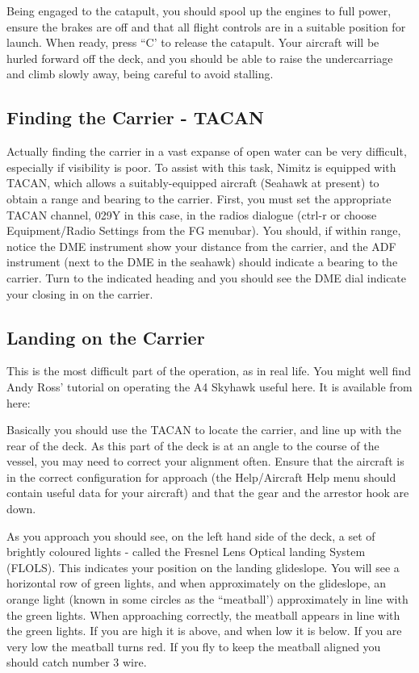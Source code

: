 Being engaged to the catapult, you should spool up the engines to full power, ensure the brakes are off 
and that all flight controls are in a suitable position for launch. When ready, press ``C' to release 
the catapult. Your aircraft will be hurled forward off the deck, and you should be able to raise the 
undercarriage and climb slowly away, being careful to avoid stalling.

\subsection{Finding the Carrier - TACAN}

Actually finding the carrier in a vast expanse of open water can be very difficult, especially if visibility 
is poor. To assist with this task, Nimitz is equipped with TACAN, which allows a suitably-equipped 
aircraft (Seahawk at present) to obtain a range and bearing to the carrier. First, you must set 
the appropriate TACAN channel, 029Y in this case, in the radios dialogue (ctrl-r or choose 
Equipment/Radio Settings from the FG menubar). You should, if within range, notice the DME instrument 
show your distance from the carrier, and the ADF instrument (next to the DME in the seahawk) should 
indicate a bearing to the carrier. Turn to the indicated heading and you should see the DME dial 
indicate your closing in on the carrier.

\subsection{Landing on the Carrier}

This is the most difficult part of the operation, as in real life. You might well find Andy Ross' tutorial on 
operating the A4 Skyhawk useful here. It is available from here:

\noindent
{}


Basically you should use the TACAN to locate the carrier, and 
line up with the rear of the deck. As this part of the deck is at an angle to the course of the vessel, 
you may need to correct your alignment often. Ensure that the aircraft is in the correct configuration for 
approach (the Help/Aircraft Help menu should contain useful data for your aircraft) and that the gear and 
the arrestor hook are down.

As you approach you should see, on the left hand side of the deck, a set of brightly coloured lights - called 
the Fresnel Lens Optical landing System (FLOLS). This indicates your position on the landing glideslope. 
You will see a horizontal row of green lights, and when approximately on the glideslope, an orange light 
(known in some circles as the ``meatball') approximately in line with the green lights. When approaching 
correctly, the meatball appears in line with the green lights. If you are high it is above, and when low 
it is below. If you are very low the meatball turns red. If you fly to keep the meatball aligned you 
should catch number 3 wire.

